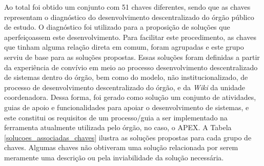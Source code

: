 Ao total foi obtido um conjunto com 51 chaves diferentes, sendo que as chaves representam o diagnóstico do desenvolvimento descentralizado do órgão público de estudo. O diagnóstico foi utilizado para a proposição de soluções que aperfeiçoassem este desenvolvimento. Para facilitar este procedimento, as chaves que tinham alguma relação direta em comum, foram agrupadas e este grupo serviu de base para as soluções propostas. Essas soluções foram definidas a partir da experiência de convívio em meio ao processo desenvolvimento descentralizado de sistemas dentro do órgão, bem como do modelo, não institucionalizado, de processo de desenvolvimento descentralizado do órgão, e da \textit{Wiki} da unidade coordenadora. Dessa forma, foi gerado como solução um conjunto de atividades, guias de apoio e funcionalidades para apoiar o desenvolvimento de sistemas, e este constitui os requisitos de um processo/guia a ser implementado na ferramenta atualmente utilizada pelo órgão, no caso, o APEX. A Tabela \ref{solucoes_associadas_chaves} ilustra as soluções propostas para cada grupo de chaves. Algumas chaves não obtiveram uma solução relacionada por serem meramente uma descrição ou pela inviabilidade da solução necessária. \clearpage

